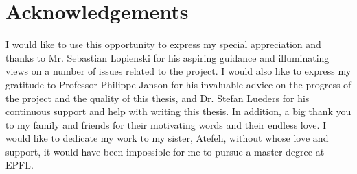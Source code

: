 \chapter*{Acknowledgements}
\thispagestyle{empty}
I would like to use this opportunity to express my special appreciation and thanks to Mr. Sebastian Lopienski for his aspiring guidance and illuminating views on a number of issues related to the project. I would also like to express my gratitude to Professor Philippe Janson for his invaluable advice on the progress of the project and the quality of this thesis, and Dr. Stefan Lueders for his continuous support and help with writing this thesis. In addition, a big thank you to my family and friends for their motivating words and their endless love. I would like to dedicate my work to my sister, Atefeh, without whose love and support, it would have been impossible for me to pursue a master degree at EPFL. 
\clearpage